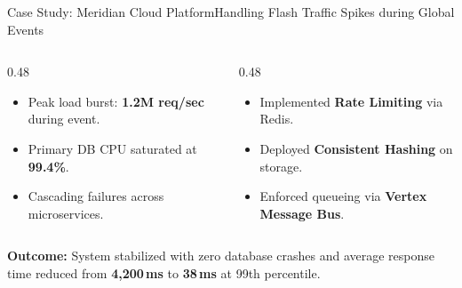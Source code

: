\documentclass[aspectratio=169, 10pt]{beamer}
\begin{document}
\begin{frame}{Case Study: Meridian Cloud Platform}{Handling Flash Traffic Spikes during Global Events}
  \vspace*{-0.3cm}
  \begin{columns}[T]
    \begin{column}{0.48\textwidth}
      \begin{tcolorbox}[nordiccard, title={\color{NordicDark}\faSearch\ \,The Challenge}]
        \begin{itemize}
          \item Peak load burst: \textbf{1.2M req/sec} during event.
          \item Primary DB CPU saturated at \textbf{99.4\%}.
          \item Cascading failures across microservices.
        \end{itemize}
      \end{tcolorbox}
    \end{column}

    \begin{column}{0.48\textwidth}
      \begin{tcolorbox}[nordicaccent, title={\color{NordicBlue}\faTools\ \,The Engineering Solution}]
        \begin{itemize}
          \item Implemented \textbf{Rate Limiting} via Redis.
          \item Deployed \textbf{Consistent Hashing} on storage.
          \item Enforced queueing via \textbf{Vertex Message Bus}.
        \end{itemize}
      \end{tcolorbox}
    \end{column}
  \end{columns}

  \vspace*{0.1cm}
  \begin{tcolorbox}[nordictealbox]
    {\color{NordicTeal}\bfseries Outcome:} System stabilized with zero database crashes and average response time reduced from \textbf{4,200\,ms} to \textbf{38\,ms} at 99th percentile.
  \end{tcolorbox}
\end{frame}
\end{document}
